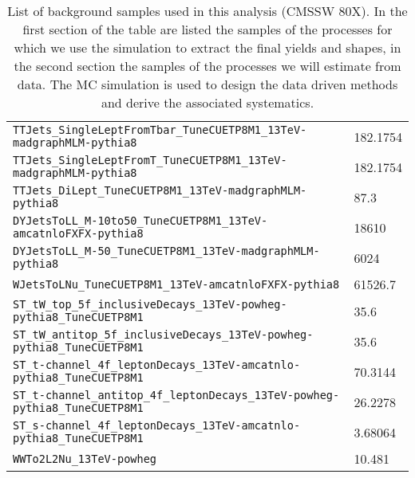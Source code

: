 \begin{table}
\begin{tabular}{ll}
\verb|TTJets_SingleLeptFromTbar_TuneCUETP8M1_13TeV-madgraphMLM-pythia8|       & 182.1754 \\
\verb|TTJets_SingleLeptFromT_TuneCUETP8M1_13TeV-madgraphMLM-pythia8|          & 182.1754 \\
\verb|TTJets_DiLept_TuneCUETP8M1_13TeV-madgraphMLM-pythia8|                   & 87.3 \\
\verb|DYJetsToLL_M-10to50_TuneCUETP8M1_13TeV-amcatnloFXFX-pythia8|            & 18610 \\
\verb|DYJetsToLL_M-50_TuneCUETP8M1_13TeV-madgraphMLM-pythia8|                 & 6024 \\
\verb|WJetsToLNu_TuneCUETP8M1_13TeV-amcatnloFXFX-pythia8|                     & 61526.7 \\
\verb|ST_tW_top_5f_inclusiveDecays_13TeV-powheg-pythia8_TuneCUETP8M1|         & 35.6 \\
\verb|ST_tW_antitop_5f_inclusiveDecays_13TeV-powheg-pythia8_TuneCUETP8M1|     & 35.6 \\
\verb|ST_t-channel_4f_leptonDecays_13TeV-amcatnlo-pythia8_TuneCUETP8M1|       & 70.3144\\
\verb|ST_t-channel_antitop_4f_leptonDecays_13TeV-powheg-pythia8_TuneCUETP8M1| & 26.2278\\
\verb|ST_s-channel_4f_leptonDecays_13TeV-amcatnlo-pythia8_TuneCUETP8M1|       & 3.68064 \\
\verb|WWTo2L2Nu_13TeV-powheg|                                                 & 10.481 \\\hline
\end{tabular}
\caption[List of background samples used in this analysis (CMSSW 80X).]{List of background samples used in this analysis (CMSSW 80X). In the first section of the table are listed the samples of the processes for which we use the simulation to extract the final yields and shapes, in the second section the samples of the processes we will estimate from data. The MC simulation is used to design the data driven methods and derive the associated systematics.} \label{tab:bgsamples}
\end{table}

